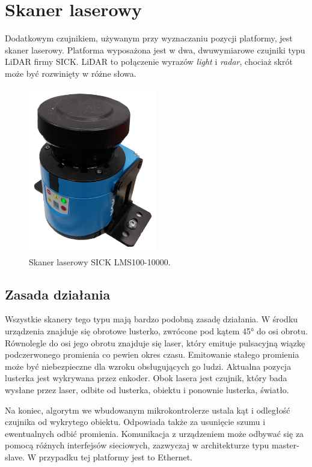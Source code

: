 \section{Skaner laserowy}
	\label{sec:lidar}
	Dodatkowym czujnikiem, używanym przy wyznaczaniu pozycji platformy, jest skaner laserowy.
	Platforma wyposażona jest w dwa, dwuwymiarowe czujniki typu LiDAR firmy SICK.
	LiDAR to połączenie wyrazów \emph{light} i \emph{radar}, chociaż skrót może być rozwinięty w różne słowa.

	\begin{figure}[h]
	\centering
	\includegraphics[width=0.5\textwidth]{graphics/sensor.png}
	\caption{Skaner laserowy SICK LMS100-10000.}
	\label{fig:sensor}
	\end{figure} 

	\subsection{Zasada działania}
		Wszystkie skanery tego typu mają bardzo podobną zasadę działania.
		W środku urządzenia znajduje się obrotowe lusterko, zwrócone pod kątem 45° do osi obrotu.
		Równolegle do osi jego obrotu znajduje się laser, który emituje pulsacyjną wiązkę podczerwonego promienia co pewien okres czasu.
		Emitowanie stałego promienia może być niebezpieczne dla wzroku obsługujących go ludzi.
		Aktualna pozycja lusterka jest wykrywana przez enkoder.
		Obok lasera jest czujnik, który bada wysłane przez laser, odbite od lusterka, obiektu i ponownie lusterka, światło.

		Na koniec, algorytm we wbudowanym mikrokontrolerze ustala kąt i odległość czujnika od wykrytego obiektu.
		Odpowiada także za usunięcie szumu i ewentualnych odbić promienia.
		Komunikacja z urządzeniem może odbywać się za pomocą różnych interfejsów sieciowych, zazwyczaj w architekturze typu master-slave.
		W przypadku tej platformy jest to Ethernet.
		
